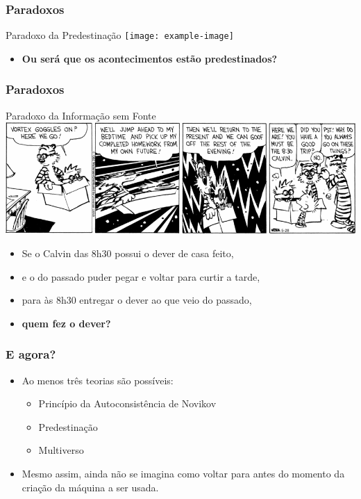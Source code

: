 \begin{frame}
    \frametitle{Paradoxos}
    
    \begin{block}{Paradoxo da Predestinação}
        \centering
        \texttt{[image: example-image]}
    \end{block}

    \begin{itemize}
        \item {\bfseries Ou será que os acontecimentos estão predestinados?}
    \end{itemize}
    
\end{frame}

\begin{frame}
    \frametitle{Paradoxos}
    
    \begin{block}{Paradoxo da Informação sem Fonte}
        \centering
        \includegraphics[width=\textwidth]{img/calvin_hobbes.png}
    \end{block}

    \begin{itemize}
        \item<2-> Se o Calvin das 8h30 possui o dever de casa feito,
        \item<3-> e o do passado puder pegar e voltar para curtir a tarde,
        \item<4-> para às 8h30 entregar o dever ao que veio do passado,
        \item<5-> {\bfseries quem fez o dever?}
    \end{itemize}
    
\end{frame}

\begin{frame}
    \frametitle{E agora?}
    
    \begin{itemize}
        \item Ao menos três teorias são possíveis:
        \begin{itemize}[<+->]
            \item Princípio da Autoconsistência de Novikov
            \item Predestinação
            \item Multiverso
        \end{itemize}
        \item<+-> Mesmo assim, ainda não se imagina como voltar para antes do momento da criação da máquina a ser usada.
    \end{itemize}
\end{frame}